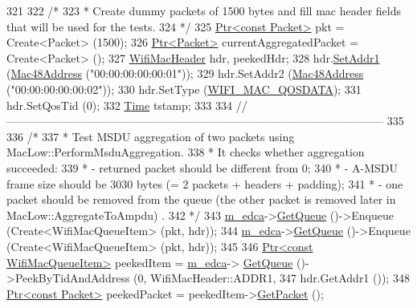 \begin{DoxyCode}
321 
322   \textcolor{comment}{/*}
323 \textcolor{comment}{   * Create dummy packets of 1500 bytes and fill mac header fields that will be used for the tests.}
324 \textcolor{comment}{   */}
325   \hyperlink{classns3_1_1Ptr}{Ptr<const Packet>} pkt = Create<Packet> (1500);
326   \hyperlink{classns3_1_1Ptr}{Ptr<Packet>} currentAggregatedPacket = Create<Packet> ();
327   \hyperlink{classns3_1_1WifiMacHeader}{WifiMacHeader} hdr, peekedHdr;
328   hdr.\hyperlink{classns3_1_1WifiMacHeader_a6478a02b80d5c01657714c5c7a0ae1cb}{SetAddr1} (\hyperlink{classns3_1_1Mac48Address}{Mac48Address} (\textcolor{stringliteral}{"00:00:00:00:00:01"}));
329   hdr.SetAddr2 (\hyperlink{classns3_1_1Mac48Address}{Mac48Address} (\textcolor{stringliteral}{"00:00:00:00:00:02"}));
330   hdr.SetType (\hyperlink{namespacens3_a9318472db39b35b2092de5c721e6ab0aafd37aea1ac3edba5410fac6367b19b1d}{WIFI\_MAC\_QOSDATA});
331   hdr.SetQosTid (0);
332   \hyperlink{classns3_1_1Time}{Time} tstamp;
333 
334   \textcolor{comment}{//-----------------------------------------------------------------------------------------------------}
335 
336   \textcolor{comment}{/*}
337 \textcolor{comment}{   * Test MSDU aggregation of two packets using MacLow::PerformMsduAggregation.}
338 \textcolor{comment}{   * It checks whether aggregation succeeded:}
339 \textcolor{comment}{   *      - returned packet should be different from 0;}
340 \textcolor{comment}{   *      - A-MSDU frame size should be 3030 bytes (= 2 packets + headers + padding);}
341 \textcolor{comment}{   *      - one packet should be removed from the queue (the other packet is removed later in
       MacLow::AggregateToAmpdu) .}
342 \textcolor{comment}{   */}
343   \hyperlink{classTwoLevelAggregationTest_a6ec1a641b23f7f6d1652462575d4feb1}{m\_edca}->\hyperlink{classns3_1_1DcaTxop_a6c89d0aeccbc5e8724d404bc45f796d7}{GetQueue} ()->Enqueue (Create<WifiMacQueueItem> (pkt, hdr));
344   \hyperlink{classTwoLevelAggregationTest_a6ec1a641b23f7f6d1652462575d4feb1}{m\_edca}->\hyperlink{classns3_1_1DcaTxop_a6c89d0aeccbc5e8724d404bc45f796d7}{GetQueue} ()->Enqueue (Create<WifiMacQueueItem> (pkt, hdr));
345 
346   \hyperlink{classns3_1_1Ptr}{Ptr<const WifiMacQueueItem>} peekedItem = \hyperlink{classTwoLevelAggregationTest_a6ec1a641b23f7f6d1652462575d4feb1}{m\_edca}->
      \hyperlink{classns3_1_1DcaTxop_a6c89d0aeccbc5e8724d404bc45f796d7}{GetQueue} ()->PeekByTidAndAddress (0, WifiMacHeader::ADDR1,
347                                                                                      hdr.GetAddr1 ());
348   \hyperlink{classns3_1_1Ptr}{Ptr<const Packet>} peekedPacket = peekedItem->\hyperlink{classns3_1_1WifiMacQueueItem_ae20827a07fef719e8b7bf53f62908e12}{GetPacket} ();

\end{DoxyCode}
